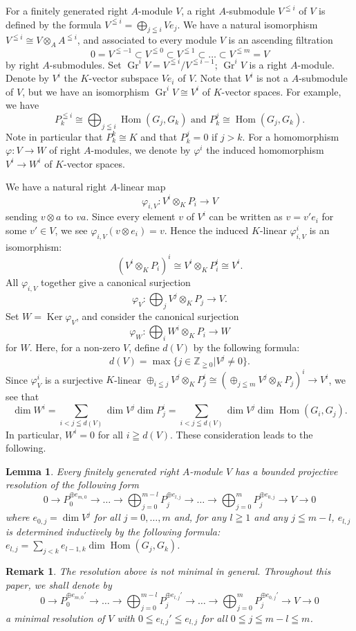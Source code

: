 \documentclass[a4paper,12pt]{amsart}
\newtheorem{lemma}[thm]{Lemma}%
\newtheorem{rmk}[thm]{Remark}%
\DeclareMathOperator{\Hom}{Hom}
\DeclareMathOperator{\Ker}{Ker}
\DeclareMathOperator{\Gr}{Gr}
\begin{document}
For a finitely generated right $A$-module $V$,
a right $A$-submodule $V^{\leqq i}$ of $V$ is defined 
by the formula $V^{\leqq i}=\bigoplus_{j\leqq i}Ve_j$.
We have a natural isomorphism $V^{\leqq i}\cong V\otimes_A A^{\leqq i}$,
and associated to every module $V$ is 
an ascending filtration 
\[0=V^{\leqq -1}\subset V^{\leqq 0}\subset V^{\leqq 1}\subset \dots\subset V^{\leqq m}=V\]
by right $A$-submodules. 
Set $\Gr^iV=V^{\leqq i}/V^{\leqq i-1}$; $\Gr^iV$ is a right $A$-module.
Denote by $V^i$ the $K$-vector subspace $Ve_i$ of $V$.
Note that $V^i$ is not a $A$-submodule of $V$,
but we have an isomorphism $\Gr^iV\cong V^i$ of $K$-vector spaces.
For example, we have 
\[P_k^{\leqq i}\cong \bigoplus_{j\leqq i}\Hom(G_j, G_k)
\textrm{ and }P_k^j\cong \Hom(G_j, G_k).\]
Note in particular that $P_k^k\cong K$ and that $P_k^j=0$ if $j>k$.
For a homomorphism $\varphi:V\to W$ of right $A$-modules,
we denote by $\varphi^i$ the induced homomorphism $V^i\to W^i$ of $K$-vector spaces.

We have a natural right $A$-linear map
\[\varphi_{i,V}:V^i\otimes_KP_i\to V\]
sending $v\otimes a$ to $va$.
Since every element $v$ of $V^i$ can be written as $v=v'e_i$ for some $v'\in V$, 
we see $\varphi_{i,V}(v\otimes e_i)=v$.
Hence the induced $K$-linear $\varphi_{i,V}^i$ is an isomorphism:
\[(V^i\otimes_KP_i)^i\cong V^i\otimes_KP_i^i\cong V^i.\]
All $\varphi_{i,V}$ together give a canonical surjection
\[\varphi_V:\bigoplus_{j}V^j\otimes_KP_j\to V.\]
Set $W=\Ker \varphi_V$, and consider the canonical surjection
\[\varphi_W:\bigoplus_{i}W^i\otimes_KP_i\to W\]
for $W$.
Here, for a non-zero $V$, define $d(V)$ by the following formula:
\[d(V)=\max \{j\in \mathbb{Z}_{\geqq 0}|V^j\neq 0\}.\]
Since $\varphi_V^i$ is a surjective $K$-linear
$\oplus_{i\leqq j}V^j\otimes_KP_j^i\cong (\oplus_{j\leqq m}V^j\otimes_KP_j)^i\to V^i$,
we see that 
\[\dim W^i
=\sum_{i<j\leqq d(V)}\dim V^j\dim P_j^i
=\sum_{i<j\leqq d(V)}\dim V^j\dim \Hom(G_i,G_j).
\]
In particular, $W^{i}=0$ for all $i\geqq d(V)$.
These consideration leads to the following.
\begin{lemma}\label{projresol}
Every finitely generated right $A$-module $V$
has a bounded projective resolution of the following form
\[0\to P_0^{\oplus e_{m,0}}\to\dots\to \bigoplus_{j=0}^{m-l}P_{j}^{\oplus e_{l,j}}\to\dots\to
\bigoplus_{j=0}^{m}P_{j}^{\oplus e_{0,j}}\to V\to 0\]
where $e_{0,j}=\dim V^j$ for all $j=0,\dots,m$
and, for any $l\geqq 1$ and any $j\leqq m-l$, $e_{l,j}$ is determined inductively by the following formula:
$e_{l,j}=\sum_{j<k}e_{l-1,k}\dim \Hom(G_j,G_k)$.
\end{lemma}
\begin{rmk}\label{MinimalResol}
The resolution above is not minimal in general.
Throughout this paper, 
we shall denote by 
\[0\to P_0^{\oplus e_{m,0}'}\to\dots\to \bigoplus_{j=0}^{m-l}P_{j}^{\oplus e_{l,j}'}\to\dots\to
\bigoplus_{j=0}^{m}P_{j}^{\oplus e_{0,j}'}\to V\to 0\]
a minimal resolution of $V$
with $0\leqq e_{l,j}'\leqq e_{l,j}$ for all $0\leqq j\leqq m-l\leqq m$.
\end{rmk}
\end{document}
